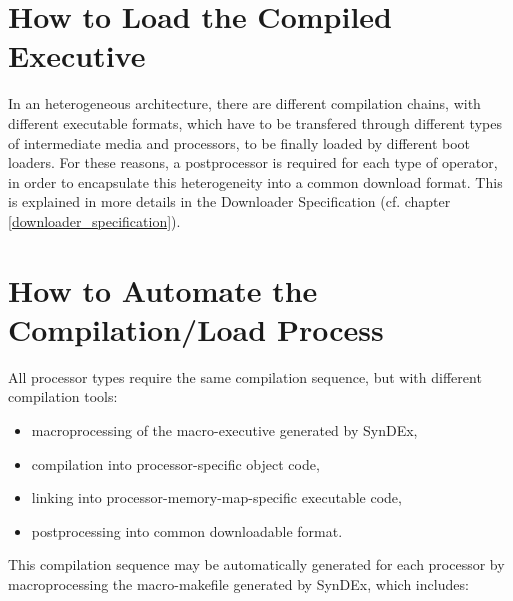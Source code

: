 \documentclass[11pt,twoside]{report}
\begin{document}
\section{How to Load the Compiled Executive}
In an heterogeneous architecture, there are different compilation
chains, with different executable formats, which have to be transfered
through different types of intermediate media and processors, to be
finally loaded by different boot loaders. For these reasons, a
postprocessor is required for each type of operator, in order to
encapsulate this heterogeneity into a common download format. This is
explained in more details in the Downloader Specification (cf. chapter
\ref {downloader_specification}).

\section{How to Automate the Compilation/Load Process}
All processor types require the same compilation sequence, but with different compilation tools:
\begin{itemize}
\item macroprocessing of the macro-executive generated by SynDEx,
\item compilation into processor-specific object code,
\item linking into processor-memory-map-specific executable code,
\item postprocessing into common downloadable format.
\end{itemize}
This compilation sequence may be automatically generated for each processor by macroprocessing the macro-makefile generated by SynDEx, which includes:
\end{document}
